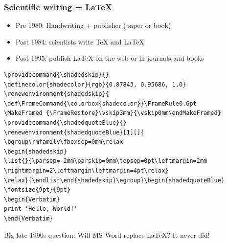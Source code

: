 \documentclass{beamer}
\begin{document}
\begin{frame}
\frametitle{Scientific writing = {\LaTeX}}

\begin{itemize}
 \item Pre 1980: Handwriting + publisher (paper or book)

 \item Post 1984: scientists write TeX and {\LaTeX}

 \item Post 1995: publish {\LaTeX} on the web or in journals and books
\end{itemize}

\noindent
\begin{verbatim}
\providecommand{\shadedskip}{}
\definecolor{shadecolor}{rgb}{0.87843, 0.95686, 1.0}
\renewenvironment{shadedskip}{
\def\FrameCommand{\colorbox{shadecolor}}\FrameRule0.6pt
\MakeFramed {\FrameRestore}\vskip3mm}{\vskip0mm\endMakeFramed}
\providecommand{\shadedquoteBlue}{}
\renewenvironment{shadedquoteBlue}[1][]{
\bgroup\rmfamily\fboxsep=0mm\relax
\begin{shadedskip}
\list{}{\parsep=-2mm\parskip=0mm\topsep=0pt\leftmargin=2mm
\rightmargin=2\leftmargin\leftmargin=4pt\relax}
\relax}{\endlist\end{shadedskip}\egroup}\begin{shadedquoteBlue}
\fontsize{9pt}{9pt}
\begin{Verbatim}
print 'Hello, World!'
\end{Verbatim}
\end{verbatim}

Big late 1990s question: Will MS Word replace {\LaTeX}? It never did!
\end{frame}
\end{document}
